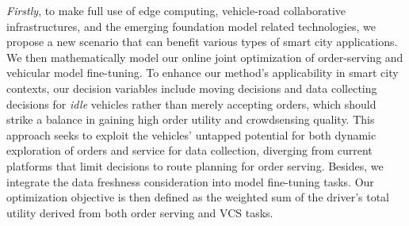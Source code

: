 \smallskip
{\em Firstly}, to make full use of edge computing, vehicle-road collaborative infrastructures, and the emerging foundation model related technologies, we propose a new scenario that can benefit various types of smart city applications. We then mathematically model our online joint optimization of order-serving and vehicular model fine-tuning. To enhance our method's applicability in smart city contexts, our decision variables include moving decisions and data collecting decisions for {\em idle} vehicles rather than merely accepting orders, which should strike a balance in gaining high order utility and crowdsensing quality. This approach seeks to exploit the vehicles' untapped potential for both dynamic exploration of orders and service for data collection, diverging from current platforms that limit decisions to route planning for order serving. Besides, we integrate the data freshness consideration into model fine-tuning tasks. Our optimization objective is then defined as the weighted sum of the driver's total utility derived from both order serving and VCS tasks. %


